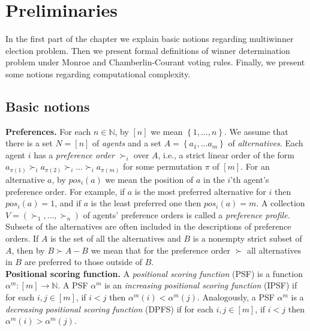 \chapter{Preliminaries}
\label{cha:preliminaries}

In the first part of the chapter we explain basic notions regarding multiwinner election problem. Then we present formal definitions of winner determination problem under Monroe and Chamberlin-Courant voting rules. Finally, we present some notions regarding computational complexity.

\section{Basic notions}

\noindent
\textbf{Preferences.} \hspace{.1in} For each $n \in \mathbb{N}$, by $[n]$ we mean $\left\{ 1, \ldots, n \right\}$. We assume that there is a set $N = [n]$ of \textit{agents} and a set $A = \left\{ a_{1}, \ldots a_{m} \right\}$ of \textit{alternatives}. Each agent $i$ has a \textit{preference order}  $\succ_{i}$ over $A$, i.e., a strict linear order of the form $a_{\pi(1)} \succ_{i} a_{\pi(2)} \succ_{i} \ldots \succ_{i} a_{\pi(m)}$ for some permutation $\pi$ of $[m]$. For an alternative $a$, by $pos_{i}(a)$ we mean the position of $a$ in the $i$'th agent's preference order. For example, if $a$ is the most preferred alternative for $i$ then $pos_{i}(a) = 1$, and if $a$ is the least preferred one then $pos_{i}(a) = m$. A collection $V = (\succ_{1}, \ldots, \succ_{n})$ of agents' preference orders is called a \textit{preference profile}.
\\

Subsets of the alternatives are often included in the descriptions of preference orders. If $A$ is the set of all the alternatives and $B$ is a nonempty strict subset of $A$, then by $B \succ A - B$ we mean that for the preference order $\succ$ all alternatives in $B$ are preferred to those outside of $B$.
\\

\noindent
\textbf{Positional scoring function.} \hspace{.1in} A \textit{positional scoring function} (PSF) is a function $\alpha^{m}: [m] \rightarrow \mathbb{N}$. A PSF $\alpha^{m}$ is an \textit{increasing positional scoring function} (IPSF) if for each $i,j \in [m]$, if $i < j$ then $\alpha^{m}(i) < \alpha^{m}(j)$. Analogously, a PSF $\alpha^{m}$ is a \textit{decreasing positional scoring function} (DPFS) if for each $i,j \in [m]$, if $i < j$ then $\alpha^{m}(i) > \alpha^{m}(j)$.
\\

